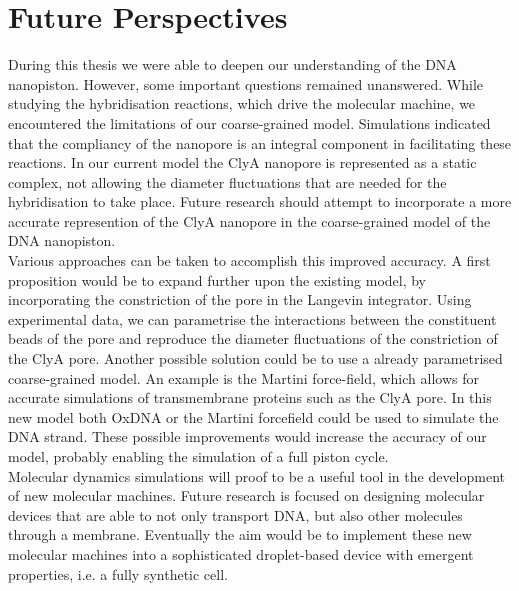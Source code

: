\section{Future Perspectives}

During this thesis we were able to deepen our understanding of the DNA
nanopiston. However, some important questions remained unanswered. While studying the
hybridisation reactions, which drive the molecular machine, we encountered the
limitations of
our coarse-grained model. Simulations indicated that the compliancy of the nanopore
is an integral component in facilitating these reactions. In our current model the ClyA
nanopore is represented as a static complex, not allowing the diameter fluctuations that
are needed for the hybridisation to take place.
Future research should attempt to incorporate a more accurate represention of the ClyA
nanopore in the coarse-grained model of the DNA nanopiston.\\

Various approaches can be taken to accomplish this improved accuracy.
A first proposition would be to expand further upon the existing model, by
incorporating the constriction of the pore in the Langevin integrator. Using experimental
data, we can parametrise the interactions between the constituent beads of the pore and
reproduce the diameter fluctuations of the constriction of the ClyA pore. Another
possible solution could be to use a already parametrised coarse-grained model.
An example is the Martini force-field, which allows for accurate simulations of
transmembrane proteins such as the ClyA pore. In this new model both OxDNA or the Martini
forcefield could be used to simulate the DNA strand. These possible improvements
would increase the accuracy of our model, probably enabling the simulation of a full
piston
cycle.\\

Molecular dynamics simulations will proof to be a useful tool in the development of
new molecular machines. Future research is focused on designing molecular devices that
are able to not only transport DNA, but also other molecules through a membrane.
Eventually the aim would be to implement these new molecular machines into a
sophisticated droplet-based device with emergent properties, i.e. a fully synthetic cell.

